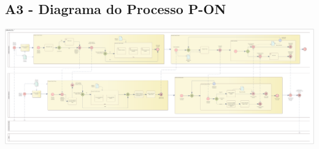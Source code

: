 \documentclass{article}
\begin{document}
\begin{landscape}
	\section*{A3 - Diagrama do Processo P-ON}
	\vspace*{\fill}
	\begin{center}
		\includegraphics[width=1.5\textheight,height=\textwidth,keepaspectratio]{A3-2}
	\end{center}
	\vspace*{\fill}
\end{landscape}

\pagebreak
\end{document}
